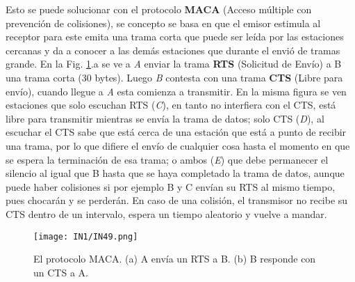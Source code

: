 \documentclass[
	12pt, %
	fleqn, %
	a4paper, %
	oneside, %
]{LegrandOrangeBook}
\begin{document}
Esto se puede solucionar con el protocolo \textbf{MACA} (Acceso múltiple con prevención de colisiones), se concepto se basa en que el emisor estimula al receptor para este emita una trama corta que puede ser leída por las estaciones cercanas y da a conocer a las demás estaciones que durante el envió de tramas grande. En la Fig. \ref{fig:MACA}.a se ve a \textit{A} enviar la trama \textbf{RTS} (Solicitud de Envío) a B una trama corta (30 bytes). Luego \textit{B} contesta con una trama \textbf{CTS} (Libre para envío), cuando llegue a \textit{A} esta comienza a transmitir. En la misma figura se ven estaciones que solo escuchan RTS (\textit{C}), en tanto no interfiera con el CTS, está libre para transmitir mientras se envía la trama de datos; solo CTS (\textit{D}), al escuchar el CTS sabe que está cerca de una estación que está a punto de recibir una trama, por lo que difiere el envío de cualquier cosa hasta el momento en que se espera la terminación de esa trama; o ambos (\textit{E}) que debe permanecer el silencio al igual que B hasta que se haya completado la trama de datos, aunque puede haber colisiones si por ejemplo B y C envían su RTS al mismo tiempo, pues chocarán y se perderán. En caso de una colisión, el transmisor no recibe su CTS dentro de un intervalo, espera un tiempo aleatorio y vuelve a mandar.
\begin{figure}[H]
\centering
\texttt{[image: IN1/IN49.png]}
\caption{El protocolo MACA. (a) A envía un RTS a B. (b) B responde con un CTS a A.}
\label{fig:MACA}
\end{figure}
\end{document}

